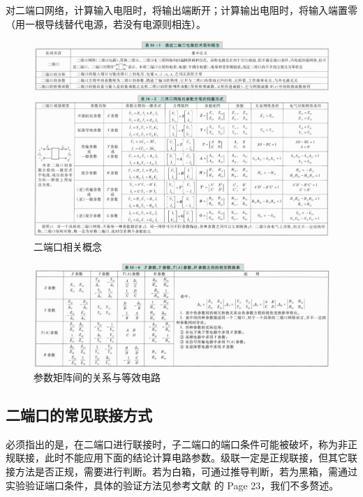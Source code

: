 \documentclass[UTF8]{report}
\theoremstyle{MyLineTheoremStyle} %
\theoremstyle{MyBlockTheoremStyle} %
\theoremstyle{MySubsubsectionStyle} %
\begin{document}
对二端口网络，计算输入电阻时，将输出端断开；计算输出电阻时，将输入端置零（用一根导线替代电源，若没有电源则相连）。

\newpage
\begin{figure}[H]\centering
\includegraphics[width=\textwidth]{assets/1,2/二端口网络.jpg}
\caption{ 二端口相关概念}\label{二端口相关概念}
\end{figure}

\begin{figure}[H]\centering
\includegraphics[width=\textwidth]{assets/1,2/image (9).jpg}
\caption{ 参数矩阵间的关系与等效电路}\label{参数矩阵间的关系与等效电路}
\end{figure}

\subsection{二端口的常见联接方式}

必须指出的是，在二端口进行联接时，子二端口的端口条件可能被破坏，称为非正规联接，此时不能应用下面的结论计算电路参数。级联一定是正规联接，但其它联接方法是否正规，需要进行判断。若为白箱，可通过推导判断，若为黑箱，需通过实验验证端口条件，具体的验证方法见参考文献 \cite{电路原理导学导教} 的 Page 23，我们不多赘述。
\end{document}
